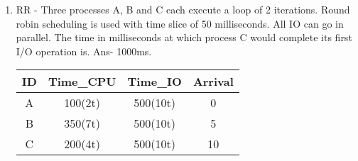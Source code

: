 \begin{enumerate}
\begin{enumerate}
          \item RR - Three processes A, B and C each execute a loop of 2 iterations. Round robin scheduling is used with
                time slice of 50 milliseconds. All IO can go in parallel. The time in milliseconds at which process C would complete
                its first I/O operation is. Ans- 1000ms.

  \begin{myTableStyle}
    \begin{center}
    \begin{tabular}{ |c|c|c|c| } \hline
          ID & Time\_CPU & Time\_IO  & Arrival \\ \hline
          A & 100(2t) & 500(10t) & 0 \\ \hline
          B & 350(7t) & 500(10t) & 5 \\ \hline
          C & 200(4t) & 500(10t) & 10 \\ \hline
    \end{tabular}
    \end{center}
  \end{myTableStyle}
  \vspace{0.08in}

        \end{enumerate}

\end{enumerate}








